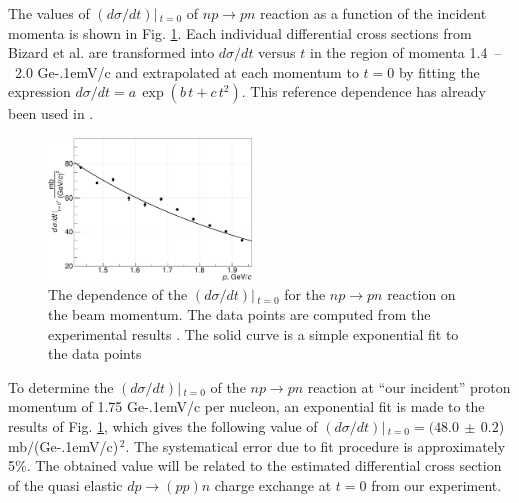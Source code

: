 \documentclass[twocolumn,epjc3]{svjour3}
\newcommand{\np}     {\ensuremath{np \rightarrow pn}\xspace}
\newcommand{\dpchex} {\ensuremath{dp \rightarrow (pp)n}\xspace}
\newcommand{\GeVc}   {Ge\kern-.1emV/c\xspace}
\begin{document}
The values of $(d\sigma/dt)|\,_{t=0}$ of \np reaction as a function of the
incident momenta is shown in Fig. \ref{fig:npsigma}. Each individual
differential cross sections from Bizard et al. \cite{biz75} are transformed into
$d\sigma/dt$ versus $t$ in the region of momenta 1.4~--~2.0 \GeVc and
extrapolated at each momentum to $t=0$ by fitting the expression
$d\sigma/dt = a\,\exp(b\,t + c\,t^2)$. This reference dependence has already
been used in \cite{gla08}.

\begin{figure}[h]
  \centering
  \includegraphics[width=0.48\textwidth]{np_dSigma.pdf}
  \caption{The dependence of the $(d\sigma/dt)|\,_{t=0}$ for the \np reaction on
    the beam momentum. The data points are computed from the experimental
    results \cite{biz75}. The solid curve is a simple exponential fit to the
    data points}
  \label{fig:npsigma}
\end{figure}

To determine the $(d\sigma/dt)|\,_{t=0}$ of the \np reaction at ``our incident''
proton momentum of 1.75 \GeVc per nucleon, an exponential fit is made to the
results of Fig. \ref{fig:npsigma}, which gives the following value of
$(d\sigma/dt)|\,_{t=0} = (48.0\,\pm\,0.2$) mb$/$(\GeVc)$^{\,2}$. The
systematical error due to fit procedure is approximately 5\%. The obtained value
will be related to the estimated differential cross section of the quasi elastic
\dpchex charge exchange at $t=0$ from our experiment.
\end{document}
